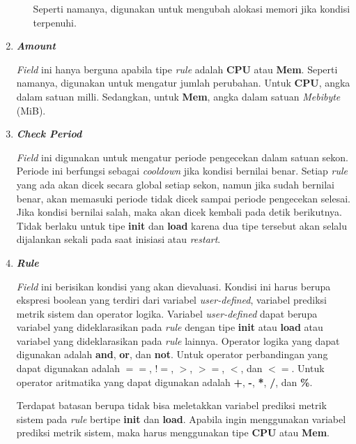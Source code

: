 \begin{enumerate}
\begin{enumerate}
            Seperti namanya, digunakan untuk mengubah alokasi memori jika kondisi terpenuhi.
        \end{enumerate}

    \item \textbf{\textit{Amount}}
    
        \textit{Field} ini hanya berguna apabila tipe \textit{rule} adalah \textbf{CPU} atau \textbf{Mem}. Seperti namanya, digunakan untuk mengatur jumlah perubahan. Untuk \textbf{CPU}, angka dalam satuan milli. Sedangkan, untuk \textbf{Mem}, angka dalam satuan \textit{Mebibyte} (MiB).
    
    \item \textbf{\textit{Check Period}}
        
        \textit{Field} ini digunakan untuk mengatur periode pengecekan dalam satuan sekon. Periode ini berfungsi sebagai \textit{cooldown} jika kondisi bernilai benar. Setiap \textit{rule} yang ada akan dicek secara global setiap sekon, namun jika sudah bernilai benar, akan memasuki periode tidak dicek sampai periode pengecekan selesai. Jika kondisi bernilai salah, maka akan dicek kembali pada detik berikutnya. Tidak berlaku untuk tipe \textbf{init} dan \textbf{load} karena dua tipe tersebut akan selalu dijalankan sekali pada saat inisiasi atau \textit{restart}.

    \item \textbf{\textit{Rule}}
        
        \textit{Field} ini berisikan kondisi yang akan dievaluasi. Kondisi ini harus berupa ekspresi boolean yang terdiri dari variabel \textit{user-defined}, variabel prediksi metrik sistem dan operator logika. Variabel \textit{user-defined} dapat berupa variabel yang dideklarasikan pada \textit{rule} dengan tipe \textbf{init} atau \textbf{load} atau variabel yang dideklarasikan pada \textit{rule} lainnya. Operator logika yang dapat digunakan adalah \textbf{and}, \textbf{or}, dan \textbf{not}. Untuk operator perbandingan yang dapat digunakan adalah \textbf{$==$}, \textbf{$!=$}, \textbf{$>$}, \textbf{$>=$}, \textbf{$<$}, dan \textbf{$<=$}. Untuk operator aritmatika yang dapat digunakan adalah \textbf{+}, \textbf{-}, \textbf{*}, \textbf{/}, dan \textbf{\%}.

        Terdapat batasan berupa tidak bisa meletakkan variabel prediksi metrik sistem pada \textit{rule} bertipe \textbf{init} dan \textbf{load}. Apabila ingin menggunakan variabel prediksi metrik sistem, maka harus menggunakan tipe \textbf{CPU} atau \textbf{Mem}.


\end{enumerate}
